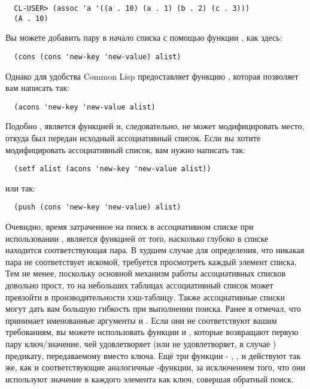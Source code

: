 \begin{verbatim}
  CL-USER> (assoc 'a '((a . 10) (a . 1) (b . 2) (c . 3)))
  (A . 10)
\end{verbatim}

Вы можете добавить пару в начало списка с помощью функции , как здесь:

\begin{verbatim}
  (cons (cons 'new-key 'new-value) alist)
\end{verbatim}

Однако для удобства Common Lisp предоставляет функцию , которая позволяет вам
написать так:

\begin{verbatim}
  (acons 'new-key 'new-value alist)
\end{verbatim}

Подобно ,  является функцией и, следовательно, не может
модифицировать место, откуда был передан исходный ассоциативный список. Если вы хотите
модифицировать ассоциативный список, вам нужно написать так:

\begin{verbatim}
  (setf alist (acons 'new-key 'new-value alist))
\end{verbatim}

или так:

\begin{verbatim}
  (push (cons 'new-key 'new-value) alist)
\end{verbatim}

Очевидно, время затраченное на поиск в ассоциативном списке при использовании
, является функцией от того, насколько глубоко в списке находится
соответствующая пара. В худшем случае для определения, что никакая пара не соответствует
искомой,  требуется просмотреть каждый элемент списка. Тем не менее, поскольку
основной механизм работы ассоциативных списков довольно прост, то на небольших таблицах
ассоциативный список может превзойти в производительности хэш-таблицу.  Также
ассоциативные списки могут дать вам большую гибкость при выполнении поиска. Ранее я
отмечал, что  принимает именованные аргументы  и . Если
они не соответствуют вашим требованиям, вы можете использовать функции  и
, которые возвращают первую пару ключ/значение, чей 
удовлетворяет (или не удовлетворяет, в случае ) предикату,
передаваемому вместо ключа. Ещё три функции - , , и
 действуют так же, как и соответствующие аналогичные
-функции, за исключением того, что они используют значение в 
каждого элемента как ключ, совершая обратный поиск.

